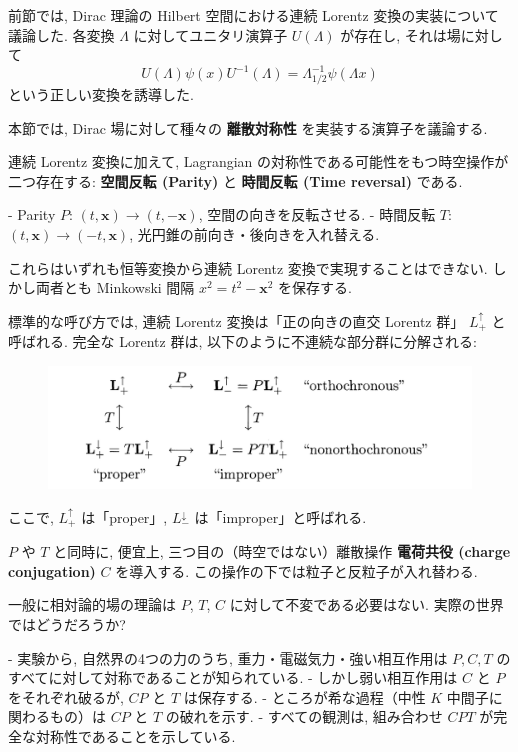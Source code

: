 \documentclass[a4paper,12pt]{article}
\begin{document}
前節では, Dirac 理論の Hilbert 空間における連続 Lorentz 変換の実装について議論した.  
各変換 $\Lambda$ に対してユニタリ演算子 $U(\Lambda)$ が存在し, それは場に対して
\begin{equation}
U(\Lambda)\psi(x)U^{-1}(\Lambda) = \Lambda^{-1}_{1/2}\psi(\Lambda x)
\tag{3.122}
\end{equation}
という正しい変換を誘導した.

本節では, Dirac 場に対して種々の \textbf{離散対称性} を実装する演算子を議論する.  

連続 Lorentz 変換に加えて, Lagrangian の対称性である可能性をもつ時空操作が二つ存在する:  
\textbf{空間反転 (Parity)} と \textbf{時間反転 (Time reversal)} である.  

- Parity $P$: $(t,\mathbf{x}) \to (t,-\mathbf{x})$, 空間の向きを反転させる.  
- 時間反転 $T$: $(t,\mathbf{x}) \to (-t,\mathbf{x})$, 光円錐の前向き・後向きを入れ替える.  

これらはいずれも恒等変換から連続 Lorentz 変換で実現することはできない.  
しかし両者とも Minkowski 間隔 $x^2=t^2-\mathbf{x}^2$ を保存する.  

標準的な呼び方では, 連続 Lorentz 変換は「正の向きの直交 Lorentz 群」 $L_+^\uparrow$ と呼ばれる.  
完全な Lorentz 群は, 以下のように不連続な部分群に分解される:

\begin{figure}[H]
\begin{center}
\includegraphics[scale=0.4]{figures/Lorentz_group.png}
\end{center}
\end{figure}

ここで, $L_+^\uparrow$ は「proper」, $L_-^\downarrow$ は「improper」と呼ばれる.

$P$ や $T$ と同時に, 便宜上, 三つ目の（時空ではない）離散操作 \textbf{電荷共役 (charge conjugation)} $C$ を導入する.  
この操作の下では粒子と反粒子が入れ替わる.

一般に相対論的場の理論は $P$, $T$, $C$ に対して不変である必要はない.  
実際の世界ではどうだろうか?  

- 実験から, 自然界の4つの力のうち, 重力・電磁気力・強い相互作用は $P,C,T$ のすべてに対して対称であることが知られている.  
- しかし弱い相互作用は $C$ と $P$ をそれぞれ破るが, $CP$ と $T$ は保存する.  
- ところが希な過程（中性 $K$ 中間子に関わるもの）は $CP$ と $T$ の破れを示す.  
- すべての観測は, 組み合わせ $CPT$ が完全な対称性であることを示している.
\end{document}
